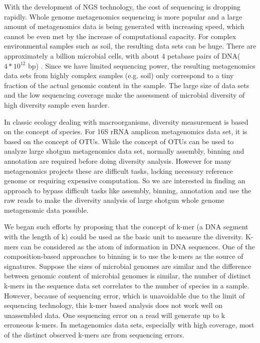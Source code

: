 \documentclass{article}
\begin{document}
With the development of NGS technology, the cost of sequencing is dropping
rapidly. Whole genome metagenomics sequencing is more popular and a large amount
of metagenomics data is being generated with increasing speed, which cannot be
even met by the increase of computational capacity.
For complex environmental samples such as
soil, the resulting data sets can be huge. There are approximately a billion
microbial cells, with about 4 petabase pairs of DNA($4*{10}^{12}$ bp)
\cite{Zarraonaindia:2013aa}. Since we have limited sequencing power, the
resulting metagenomics data sets from highly complex samples (e.g. soil) only
correspond to a tiny fraction of the actual genomic content in the sample. The
large size of data sets and the low sequencing coverage make the assessment of
microbial diversity of high diversity sample even harder. 


In classic ecology dealing with macroorganisms, diversity measurement is based 
on the concept of species. For 16S rRNA amplicon metagenomics data set, it is 
based on the concept of OTUs. While the concept of OTUs can be used to analyze
large shotgun metagenomics data set, normally assembly, binning and annotation
are required before doing diversity analysis. However for many metagenomics 
projects these are difficult
tasks, lacking necessary reference genome or requiring expensive
computation. So we are interested in finding an approach to bypass difficult
tasks like assembly, binning, annotation and use the raw reads to make the 
diversity analysis of large shotgun whole genome metagenomic data possible. 

We began such efforts by proposing that
 the concept of k-mer (a DNA segment with the length of k) could be used as the 
 basic unit to measure
the diversity. K-mers can be considered as the atom of information in DNA 
sequences. One of the composition-based approaches to binning is to use the 
k-mers as the source of signatures\cite{Alneberg2014, Imelfort2014}. Suppose the sizes of microbial genomes are similar and
 the difference between genomic content of microbial genomes is similar, the 
number of distinct k-mers in the sequence data set correlates to the number of 
species in a sample. However, because of sequencing error, which is unavoidable
 due to the limit of sequencing technology, this k-mer based analysis does not 
work well on unassembled data. One sequencing error on a read will generate up to k erroneous 
k-mers. In metagenomics data sets, especially with high coverage, most of the 
distinct observed k-mers are from sequencing errors.
\end{document}
